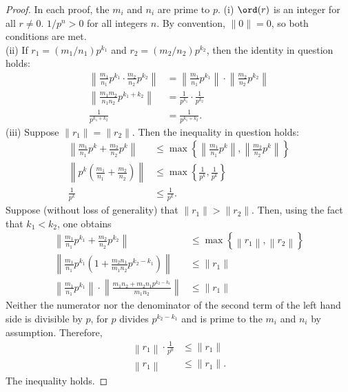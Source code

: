 \documentclass[11pt, oneside]{article}
\begin{document}
\begin{enumerate}
\begin{proof}
In each proof, the $m_i$ and $n_i$ are prime to $p$. (i) $\ord(r)$ is an integer for all $r\neq 0$. $1/p^n > 0$ for all integers $n$. By convention, $\| 0 \| =0$, so both conditions are met.\\
(ii) If $r_1=(m_1/n_1)p^{k_1}$ and $r_2 = (m_2/n_2)p^{k_2}$, then the identity in question holds:
\begin{align*}
\left\| \frac{m_1}{n_1}p^{k_1} \cdot \frac{m_2}{n_2}p^{k_2} \right\| & = \left\| \frac{m_1}{n_1}p^{k_1} \right\| \cdot \left\| \frac{m_2}{n_2}p^{k_2} \right\|\\
\left\| \frac{m_1m_2}{n_1n_2}p^{k_1+k_2} \right\| & =\frac{1}{p^{k_1}} \cdot \frac{1}{p^{k_2}}\\
\frac{1}{p^{k_1+k_2}} &= \frac{1}{p^{k_1+k_2}} .
\end{align*}
(iii) Suppose $\|r_1\| = \|r_2\|$. Then the inequality in question holds:
\begin{align*}
\left\|\frac{m_1}{n_1}p^{k}+\frac{m_2}{n_2}p^{k}\right\|& \le  \max\left\{   \left\|\frac{m_1}{n_1}p^{k}\right\| , \left\|\frac{m_2}{n_2}p^{k}\right\| \right\}\\
\left\|p^k \left(\frac{m_1}{n_1}+\frac{m_2}{n_2}\right)\right\|& \le  \max\left\{   \frac{1}{p^{k}} , \frac{1}{p^k}\right\}\\
\frac{1}{p^k} &\le  \frac{1}{p^k}.
\end{align*}
Suppose (without loss of generality) that $\|r_1\|>\|r_2\|$. Then, using the fact that $k_1 < k_2$, one obtains
\begin{align*}
\left\|\frac{m_1}{n_1}p^{k_1}+\frac{m_2}{n_2}p^{k_2}\right\|& \le  \max\left\{   \left\| r_1\right\| ,\left \|r_2\right\|\right\}\\
\left\|\frac{m_1}{n_1}p^{k_1} \left(1+\frac{m_2n_1}{m_1n_2}p^{k_2-k_1}\right)\right\|& \le  \|r_1\|\\
\left\|\frac{m_1}{n_1}p^{k_1}\right\| \cdot \left\|\frac{m_1n_2 + m_2n_1p^{k_2-k_1}}{m_1n_2}\right\|& \le  \|r_1\|
\end{align*}
Neither the numerator nor the denominator of the second term of the left hand side is divisible by $p$, for $p$ divides $p^{k_2-k_1}$ and is prime to the $m_i$ and $n_i$ by assumption. Therefore,
\begin{align*}
\left\|r_1\right\| \cdot \frac{1}{p^0}& \le  \|r_1\|\\
\left\|r_1\right\| &\le  \| r_1\|.
\end{align*}
The inequality holds. %
\end{proof}

\end{enumerate}
\end{document}
